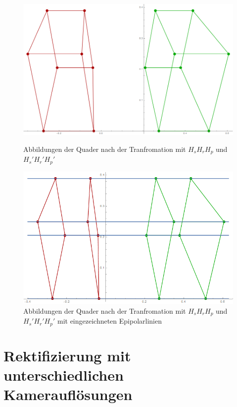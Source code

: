 \begin{figure}[!htb]
	\includegraphics[width=\linewidth]{images/Rectification_HsHrHp_same_Solutions.png}
	\caption[$H_sH_rH_p$ und $H_s'H_r'H_p'$ Transformation]{Abbildungen der Quader nach der Tranfromation mit $H_sH_rH_p$ und $H_s'H_r'H_p'$}
	\label{fig:RectSameHsHrHp1}
	\endminipage\hfill
	\includegraphics[width=\linewidth]{images/Rectification_HsHrHp_same_Solutions_Lines.png}
	\caption[$H_sH_rH_p$ und $H_s'H_r'H_p'$ Transformation mit Epipolarlinien]{Abbildungen der Quader nach der Tranfromation mit $H_sH_rH_p$ und $H_s'H_r'H_p'$ mit eingezeichneten Epipolarlinien}
	\label{fig:RectSameHsHrHp2}
	\endminipage\hfill
\end{figure}

\section{Rektifizierung mit unterschiedlichen Kamerauflösungen}


